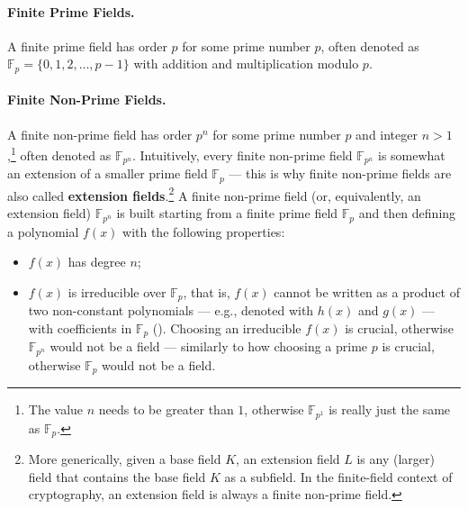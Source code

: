 \paragraph*{Finite Prime Fields.} A finite prime field has order $p$ for some prime number $p$, often denoted as $\mathbb{F}_p = \{0, 1, 2, \ldots, p-1\}$ with addition and multiplication modulo $p$.


\paragraph*{Finite Non-Prime Fields.} A finite non-prime field has order $p^n$ for some prime number $p$ and integer $n > 1$,\footnote{The value $n$ needs to be greater than $1$, otherwise $\mathbb{F}_{p^1}$ is really just the same as $\mathbb{F}_p$.} often denoted as $\mathbb{F}_{p^n}$. Intuitively, every finite non-prime field $\mathbb{F}_{p^n}$ is somewhat an extension of a smaller prime field $\mathbb{F}_p$ --- this is why finite non-prime fields are also called \textbf{extension fields}.\footnote{More generically, given a base field $K$, an extension field $L$ is any (larger) field that contains the base field $K$ as a subfield. In the finite-field context of cryptography, an extension field is always a finite non-prime field.} A finite non-prime field (or, equivalently, an extension field) $\mathbb{F}_{p^n}$ is built starting from a finite prime field $\mathbb{F}_p$ and then defining a polynomial $f(x)$ with the following properties:
\begin{itemize}
	\item $f(x)$ has degree $n$;
	\item $f(x)$ is irreducible over $\mathbb{F}_p$, that is, $f(x)$ cannot be written as a product of two non-constant polynomials --- e.g., denoted with $h(x)$ and $g(x)$ --- with coefficients in $\mathbb{F}_p$ (). Choosing an irreducible $f(x)$ is crucial, otherwise $\mathbb{F}_{p^n}$ would not be a field --- similarly to how choosing a prime $p$ is crucial, otherwise $\mathbb{F}_p$ would not be a field.
\end{itemize}

